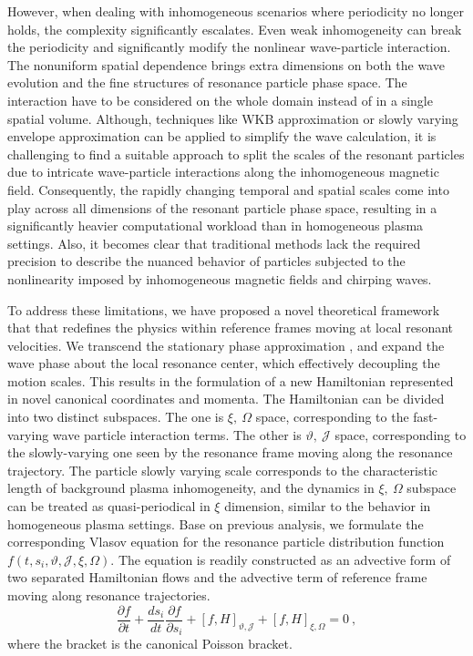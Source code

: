 However, when dealing with inhomogeneous scenarios where periodicity no longer holds, the complexity significantly escalates. Even weak inhomogeneity can break the periodicity and significantly modify the nonlinear wave-particle interaction.
The nonuniform spatial dependence brings extra dimensions on both the wave evolution and the fine structures of resonance particle phase space.
The interaction have to be considered on the whole domain instead of in a single spatial volume.
Although, techniques like WKB approximation \cite{wkb} or slowly varying envelope approximation \cite{svap} can be applied to simplify the wave calculation, it is challenging to find a suitable approach to split the scales of the resonant particles due to intricate wave-particle interactions along the inhomogeneous magnetic field.
Consequently, the rapidly changing temporal and spatial scales come into play across all dimensions of the resonant particle phase space, resulting in a significantly heavier computational workload than in homogeneous plasma settings.
Also, it becomes clear that traditional methods lack the required precision to describe the nuanced behavior of particles subjected to the nonlinearity imposed by inhomogeneous magnetic fields and chirping waves.

To address these limitations, we have proposed a novel theoretical framework \cite{} that  that redefines the physics within reference frames moving at local resonant velocities.
We transcend the stationary phase approximation \cite{spa1,spa2}, and expand the wave phase about the local resonance center, which effectively decoupling the motion scales. 
This results in the formulation of a new Hamiltonian represented in novel canonical coordinates and momenta.
The Hamiltonian can be divided into two distinct subspaces.
The one is $\xi,~\Omega$ space, corresponding to the fast-varying wave particle interaction terms.
The other is $\vartheta,~\mathcal{J}$ space, corresponding to the slowly-varying one seen by the resonance frame moving along the resonance trajectory.
The particle slowly varying scale corresponds to the characteristic length of background plasma inhomogeneity, and the dynamics in $\xi,~\Omega$ subspace can be treated as quasi-periodical in $\xi$ dimension, similar to the behavior in homogeneous plasma settings.
Base on previous analysis, we formulate the corresponding Vlasov equation for the resonance particle distribution function $f(t,s_i,\vartheta,\mathcal{J},\xi,\Omega)$. The equation is readily constructed as an advective form of two separated Hamiltonian flows and the advective term of reference frame moving along resonance trajectories.
\begin{equation}\label{eq.Vlasov}
    \frac{\partial f}{\partial t}+ \frac{d s_{i}}{d t} \frac{\partial f}{\partial s_{i}} + \left[f, H\right]_{\vartheta,\mathcal{J}} +  \left[f, H\right]_{\xi,\Omega} = 0~,
\end{equation}
where the bracket is the canonical Poisson bracket.

